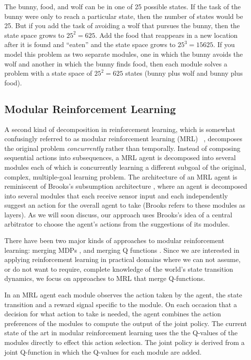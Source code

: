 The bunny, food, and wolf can be in one of 25 possible states. If the task of the bunny were only to reach a particular state, then the number of states would be 25. But if you add the task of avoiding a wolf that pursues the bunny, then the state space grows to $25^2 = 625$. Add the food that reappears in a new location after it is found and ``eaten'' and the state space grows to $25^3 = 15625$. If you model this problem as two separate modules, one in which the bunny avoids the wolf and another in which the bunny finds food, then each module solves a problem with a state space of $25^2 = 625$ states (bunny plus wolf and bunny plus food).

\subsection{Modular Reinforcement Learning}\label{sec:mrl}

A second kind of decomposition in reinforcement learning, which is somewhat confusingly referred to as modular reinforcement learning (MRL) ~\cite{russell2003q-decomposition,sprague2003multiple-goal}, decomposes the original problem {\it concurrently} rather than temporally. Instead of composing sequential actions into subsequences, a MRL agent is decomposed into several modules each of which is concurrently learning a different subgoal of the original, complex, multiple-goal learning problem. The architecture of an MRL agent is reminiscent of Brooks's subsumption architecture \cite{brooks1986a-robust}, where an agent is decomposed into several modules that each receive sensor input and each independently suggest an action for the overall agent to take (Brooks refers to these modules as layers). As we will soon discuss, our approach uses Brooks's idea of a central arbitrator to choose the agent's actions from the suggestions of its modules.

There have been two major kinds of approaches to modular reinforcement learning: merging MDPs \cite{singh1998how-to-dynamically}, and merging Q functions \cite{sprague2003multiple-goal,russell2003q-decomposition}. Since we are interested in applying reinforcement learning in practical domains where we can not assume, or do not want to require, complete knowledge of the world's state transition dynamics, we focus on approaches to MRL that merge Q-functions.

In an MRL agent each module observes the action taken by the agent, the state transition and a reward signal specific to the module. On each occasion that a decision for what action to take is needed, the agent combines the action preferences of the modules to compute the output of the joint policy.  The current state of the art in modular reinforcement learning uses the the Q-values of the modules directly to effect this action selection. The joint policy is derived from a joint Q-function in which the Q-values for each module are added.

